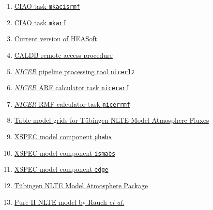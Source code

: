 \begin{enumerate}[1]
		\item \href{https://cxc.cfa.harvard.edu/ciao/ahelp/mkacisrmf.html}{CIAO task \texttt{mkacisrmf}}
		\item \href{https://cxc.cfa.harvard.edu/ciao/ahelp/mkarf.html}{CIAO task \texttt{mkarf}}
		\item \href{https://heasarc.gsfc.nasa.gov/docs/software/heasoft/}{Current version of HEASoft}
		\item \href{https://heasarc.gsfc.nasa.gov/docs/heasarc/caldb/caldb_remote_access.html}{CALDB remote access procedure}
		\item \href{https://heasarc.gsfc.nasa.gov/lheasoft/ftools/headas/nicerl2.html}{\textit{NICER} pipeline processing tool \texttt{nicerl2}}
		\item \href{https://heasarc.gsfc.nasa.gov/lheasoft/ftools/headas/nicerarf.html}{\textit{NICER} ARF calculator task \texttt{nicerarf}}
		\item \href{https://heasarc.gsfc.nasa.gov/lheasoft/ftools/headas/nicerrmf.html}{\textit{NICER} RMF calculator task \texttt{nicerrmf}}
		\item \href{http://astro.uni-tuebingen.de/~rauch/TMAF/TMAF.html}{Table model grids for T\"{u}bingen NLTE Model Atmosphere Fluxes}
		\item \href{https://heasarc.gsfc.nasa.gov/xanadu/xspec/manual/XSmodelPhabs.html}{XSPEC model component \texttt{phabs}}
		\item \href{https://heasarc.gsfc.nasa.gov/xanadu/xspec/manual/node255.html}{XSPEC model component \texttt{ismabs}}
		\item \href{https://heasarc.gsfc.nasa.gov/xanadu/xspec/manual/node247.html}{XSPEC model component \texttt{edge}}
		\item \href{http://astro.uni-tuebingen.de/~rauch/TMAP/TMAP.html}{T\"{u}bingen NLTE Model Atmosphere Package}
		\item \href{http://astro.uni-tuebingen.de/~rauch/TMAF/flux_H.html}{Pure H NLTE model by Rauch \textit{et al.}}
	\end{enumerate}